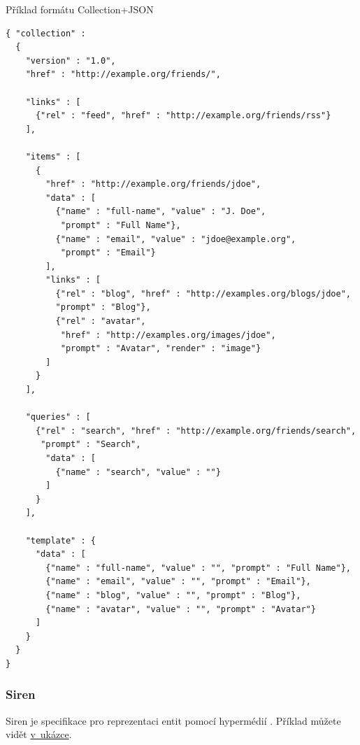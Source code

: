 \begin{listing}[htbp]
\caption{{\label{code:collectionjson}Příklad formátu Collection+JSON \autocite{collectionjson}}}
\begin{verbatim}
{ "collection" :
  {
    "version" : "1.0",
    "href" : "http://example.org/friends/",
    
    "links" : [
      {"rel" : "feed", "href" : "http://example.org/friends/rss"}
    ],

    "items" : [
      {
        "href" : "http://example.org/friends/jdoe",
        "data" : [
          {"name" : "full-name", "value" : "J. Doe",
           "prompt" : "Full Name"},
          {"name" : "email", "value" : "jdoe@example.org",
           "prompt" : "Email"}
        ],
        "links" : [
          {"rel" : "blog", "href" : "http://examples.org/blogs/jdoe",
          "prompt" : "Blog"},
          {"rel" : "avatar",
           "href" : "http://examples.org/images/jdoe",
           "prompt" : "Avatar", "render" : "image"}
        ]
      }
    ],

    "queries" : [
      {"rel" : "search", "href" : "http://example.org/friends/search",
       "prompt" : "Search",
        "data" : [
          {"name" : "search", "value" : ""}
        ]
      }
    ],

    "template" : {
      "data" : [
        {"name" : "full-name", "value" : "", "prompt" : "Full Name"},
        {"name" : "email", "value" : "", "prompt" : "Email"},
        {"name" : "blog", "value" : "", "prompt" : "Blog"},
        {"name" : "avatar", "value" : "", "prompt" : "Avatar"}
      ]
    }
  }
}
\end{verbatim}
\end{listing}

\subsubsection*{Siren}\label{siren}

Siren je specifikace pro reprezentaci entit pomocí hypermédií \autocite{siren}. Příklad můžete vidět \protect\hyperlink{code:siren}{v~ukázce}.

